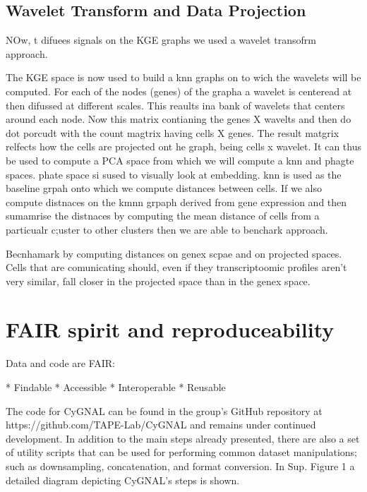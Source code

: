\subsection{Wavelet Transform and Data Projection}

NOw, t difuees signals on the KGE graphs we used a wavelet transofrm approach.

The KGE space is now used to build a knn graphs on to wich the wavelets will be computed. For each of the nodes (genes) of the grapha a wavelet is centeread at then difussed at different scales. This reaults ina  bank of wavelets that centers around each node. 
Now this matrix contianing the genes X wavelts  and then do dot porcudt with the count magtrix having cells X genes. The result matgrix relfects how the cells are projected ont he graph, being cells x wavelet.
It can thus be used to compute a PCA space from which we will compute a knn and phagte spaces. phate space si sused to visually look at embedding. knn is used as the baseline grpah onto which we compute distances between cells.
If we also compute distnaces on the kmnn grpaph derived from gene expression and then sumamrise the distnaces by computing the mean distance of cells from a particualr c;uster to other clusters then we are able to benchark approach.

Becnhamark by computing distances on genex scpae and on projected spaces. Cells that are comunicating should, even if they transcriptoomic profiles aren't very similar, fall closer in the projected space than in the genex space.







\section{FAIR spirit and reproduceability}

Data and code are FAIR:

* Findable
* Accessible
* Interoperable
* Reusable

The code for CyGNAL can be found in the group’s GitHub repository at  https://github.com/TAPE-Lab/CyGNAL and remains under continued development. In addition to the main steps already presented, there are also a set of utility scripts that can be used for performing common dataset manipulations; such as downsampling, concatenation, and format conversion. In Sup. Figure 1 a detailed diagram depicting CyGNAL’s steps is shown.









